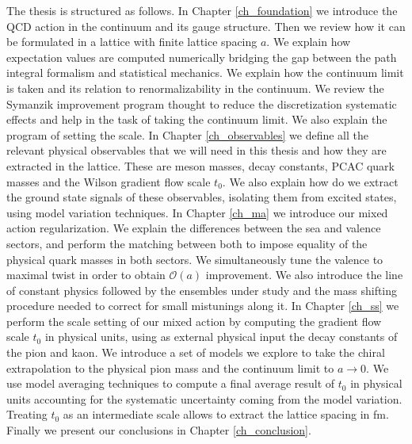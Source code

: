 The thesis is structured as follows. In Chapter \ref{ch_foundation} we introduce the QCD action in the continuum and its gauge structure. Then we review how it can be formulated in a lattice with finite lattice spacing $a$. We explain how expectation values are computed numerically bridging the gap between the path integral formalism and statistical mechanics. We explain how the continuum limit is taken and its relation to renormalizability in the continuum. We review the Symanzik improvement program thought to reduce the discretization systematic effects and help in the task of taking the continuum limit. We also explain the program of setting the scale. In Chapter \ref{ch_observables} we define all the relevant physical observables that we will need in this thesis and how they are extracted in the lattice. These are meson masses, decay constants, PCAC quark masses and the Wilson gradient flow scale $t_0$. We also explain how do we extract the ground state signals of these observables, isolating them from excited states, using model variation techniques. In Chapter \ref{ch_ma} we introduce our mixed action regularization. We explain the differences between the sea and valence sectors, and perform the matching between both to impose equality of the physical quark masses in both sectors. We simultaneously tune the valence to maximal twist in order to obtain $\mathcal{O}(a)$ improvement. We also introduce the line of constant physics followed by the ensembles under study and the mass shifting procedure needed to correct for small mistunings along it. In Chapter \ref{ch_ss} we perform the scale setting of our mixed action by computing the gradient flow scale $t_0$ in physical units, using as external physical input the decay constants of the pion and kaon. We introduce a set of models we explore to take the chiral extrapolation to the physical pion mass and the continuum limit to $a\to0$. We use model averaging techniques to compute a final average result of $t_0$ in physical units accounting for the systematic uncertainty coming from the model variation. Treating $t_0$ as an intermediate scale allows to extract the lattice spacing in fm. Finally we present our conclusions in Chapter \ref{ch_conclusion}. 

